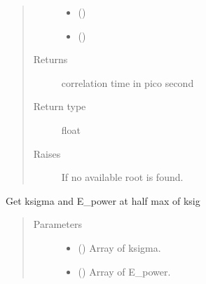 \documentclass[letterpaper,10pt,english]{sphinxmanual}
\begin{document}
\begin{fulllineitems}
\begin{fulllineitems}
\begin{quote}
\begin{description}
\begin{itemize}
\item {} 
 () \sphinxhyphen{}\sphinxhyphen{} 

\item {} 
 () \sphinxhyphen{}\sphinxhyphen{} 

\end{itemize}

\item[{Returns}] \leavevmode
correlation time in pico second

\item[{Return type}] \leavevmode
float

\item[{Raises}] \leavevmode
{\hyperref[\detokenize{dnpHydration:dnpLab.dnpHydration.FitError}]{}} \sphinxhyphen{}\sphinxhyphen{} If no available root is found.

\end{description}\end{quote}

\end{fulllineitems}


\begin{fulllineitems}
\label{\detokenize{dnpHydration:dnpLab.dnpHydration.HydrationCalculator.get_ksigma}}
Get ksigma and E\_power at half max of ksig
\begin{quote}\begin{description}
\item[{Parameters}] \leavevmode\begin{itemize}
\item {} 
 () \sphinxhyphen{}\sphinxhyphen{} Array of ksigma.

\item {} 
 () \sphinxhyphen{}\sphinxhyphen{} Array of E\_power.


\end{itemize}
\end{description}
\end{quote}
\end{fulllineitems}
\end{fulllineitems}
\end{document}
